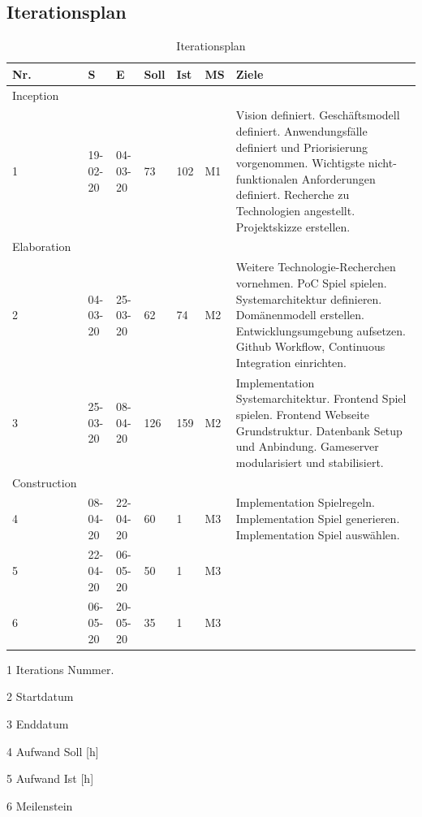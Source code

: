 \documentclass[11pt,ngerman]{article}
\begin{document}
    \subsection{Iterationsplan}
    \begin{table}[H]
    	\caption{Iterationsplan}
        \begin{threeparttable}
    	   \begin{tabularx}{\textwidth}{l l l l l l X}

    	   	\toprule
    	   	Nr.\tnote{1} & S\tnote{2} & E\tnote{3} &  Soll\tnote{4}  & Ist\tnote{5} & MS\tnote{6} & Ziele \\
    	   	\toprule
    	   	Inception &&&& \\

    	   	1 & 19-02-20 & 04-03-20 & 73 & 102 & M1 & Vision definiert. Geschäftsmodell definiert. Anwendungsfälle definiert und Priorisierung vorgenommen. Wichtigste nicht-funktionalen Anforderungen definiert. Recherche zu Technologien angestellt. Projektskizze erstellen. \\

    	   	\toprule
    	   	Elaboration &&&& \\

    	   	2 & 04-03-20 & 25-03-20 & 62 & 74 & M2 & Weitere Technologie-Recherchen vornehmen. PoC Spiel spielen. Systemarchitektur definieren. Domänenmodell erstellen. Entwicklungsumgebung aufsetzen. Github Workflow, Continuous Integration einrichten. \\

    	   	3 & 25-03-20 & 08-04-20 & 126 & 159 & M2 & Implementation Systemarchitektur. Frontend Spiel spielen. Frontend Webseite Grundstruktur. Datenbank Setup und Anbindung. Gameserver modularisiert und stabilisiert. \\

    	   	\toprule
    	   	Construction &&&&\\

    	   	4 & 08-04-20 & 22-04-20 & 60 & 1 & M3 & Implementation Spielregeln. Implementation Spiel generieren. Implementation Spiel auswählen. \\

    	   	5 & 22-04-20 & 06-05-20 & 50 & 1 & M3 & \\

    	   	6 & 06-05-20 & 20-05-20 & 35 & 1 & M3 & \\
    	   	\toprule

    	   \end{tabularx}
        \begin{tablenotes}
            \item[1] Iterations Nummer.
            \item[2] Startdatum
            \item[3] Enddatum
            \item[4] Aufwand Soll [h]
            \item[5] Aufwand Ist [h]
            \item[6] Meilenstein
        \end{tablenotes}
       \end{threeparttable}



\end{table}
\end{document}
